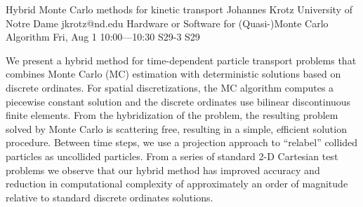 \begin{talk}


\end{talk}

\begin{talk}
  {Hybrid Monte Carlo methods for kinetic transport}%
  {Johannes Krotz}%
  {University of Notre Dame}%
  {jkrotz@nd.edu}%
  {Hardware or Software for (Quasi-)Monte Carlo Algorithm}%
  {}%
  {Fri, Aug 1 10:00---10:30}%
  {S29-3}%
  {S29}%
    
   

We present a hybrid method for time-dependent particle transport problems that combines Monte Carlo (MC) estimation with deterministic solutions based on discrete ordinates. For spatial discretizations, the MC algorithm computes a piecewise constant solution and the discrete ordinates use bilinear discontinuous finite elements. From the hybridization of the problem, the resulting problem solved by Monte Carlo is scattering free, resulting in a simple, efficient solution procedure. Between time steps, we use a projection approach to “relabel” collided particles as uncollided particles. From a series of standard 2-D Cartesian test problems we observe that our hybrid method has improved accuracy and reduction in computational complexity of approximately an order of magnitude relative to standard discrete ordinates solutions.

\end{talk}

